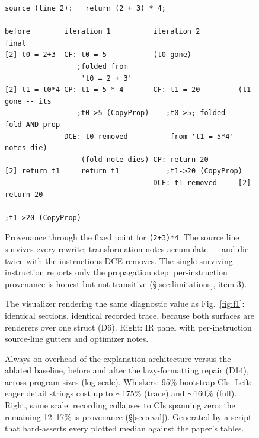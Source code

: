 
\begin{figure}[t]
\begin{lstlisting}
source (line 2):   return (2 + 3) * 4;

before        iteration 1          iteration 2         final
[2] t0 = 2+3  CF: t0 = 5           (t0 gone)
                 ;folded from
                  't0 = 2 + 3'
[2] t1 = t0*4 CP: t1 = 5 * 4       CF: t1 = 20         (t1 gone -- its
                 ;t0->5 (CopyProp)    ;t0->5; folded     fold AND prop
              DCE: t0 removed          from 't1 = 5*4'   notes die)
                  (fold note dies) CP: return 20
[2] return t1     return t1           ;t1->20 (CopyProp)
                                   DCE: t1 removed     [2] return 20
                                                          ;t1->20 (CopyProp)
\end{lstlisting}
\caption{Provenance through the fixed point for \texttt{(2+3)*4}.
The source line survives every rewrite; transformation notes
accumulate --- and die twice with the instructions DCE removes. The
single surviving instruction reports only the propagation step:
per-instruction provenance is honest but not transitive
(\S\ref{sec:limitations}, item 3).}
\label{fig:f5}
\end{figure}

\begin{figure}[t]
\centering
{}
\caption{The visualizer rendering the same diagnostic value as
Fig.~\ref{fig:f1}: identical sections, identical recorded trace,
because both surfaces are renderers over one struct (D6). Right: IR
panel with per-instruction source-line gutters and optimizer notes.}
\label{fig:f6}
\end{figure}

\begin{figure}[t]
\centering

\caption{Always-on overhead of the explanation architecture versus
the ablated baseline, before and after the lazy-formatting repair
(D14), across program sizes (log scale). Whiskers: 95\% bootstrap
CIs. Left: eager detail strings cost up to $\sim$175\% (trace) and
$\sim$160\% (full). Right, same scale: recording collapses to CIs
spanning zero; the remaining 12--17\% is provenance
(\S\ref{sec:eval}). Generated by a script that hard-asserts every
plotted median against the paper's tables.}
\label{fig:f7}
\end{figure}
